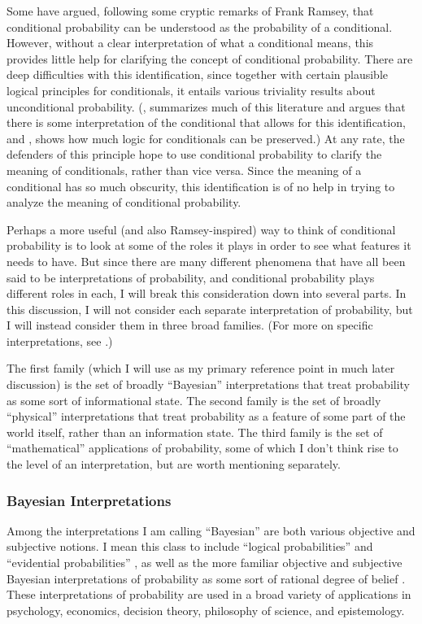 Some have argued, following some cryptic remarks of Frank Ramsey, that conditional probability can be understood as the probability of a conditional. However, without a clear interpretation of what a conditional means, this provides little help for clarifying the concept of conditional probability. There are deep difficulties with this identification, since together with certain plausible logical principles for conditionals, it entails various triviality results about unconditional probability. (\citealp{edgington}, summarizes much of this literature and argues that there is some interpretation of the conditional that allows for this identification, and \citealp{baconstalnaker}, shows how much logic for conditionals can be preserved.) At any rate, the defenders of this principle hope to use conditional probability to clarify the meaning of conditionals, rather than vice versa. Since the meaning of a conditional has so much obscurity, this identification is of no help in trying to analyze the meaning of conditional probability.

Perhaps a more useful (and also Ramsey-inspired) way to think of conditional probability is to look at some of the roles it plays in order to see what features it needs to have. But since there are many different phenomena that have all been said to be interpretations of probability, and conditional probability plays different roles in each, I will break this consideration down into several parts. In this discussion, I will not consider each separate interpretation of probability, but I will instead consider them in three broad families. (For more on specific interpretations, see \citealp{interp}.)

The first family (which I will use as my primary reference point in much later discussion) is the set of broadly ``Bayesian'' interpretations that treat probability as some sort of informational state. The second family is the set of broadly ``physical'' interpretations that treat probability as a feature of some part of the world itself, rather than an information state. The third family is the set of ``mathematical'' applications of probability, some of which I don't think rise to the level of an interpretation, but are worth mentioning separately.

\subsubsection{Bayesian Interpretations}

Among the interpretations I am calling ``Bayesian'' are both various objective and subjective notions. I mean this class to include ``logical probabilities'' \citep{keynes, carnapprob, maherconception} and ``evidential probabilities'' \citep{kail}, as well as the more familiar objective and subjective Bayesian interpretations of probability as some sort of rational degree of belief \citep{bayes1, bayes2}. These interpretations of probability are used in a broad variety of applications in psychology, economics, decision theory, philosophy of science, and epistemology.

